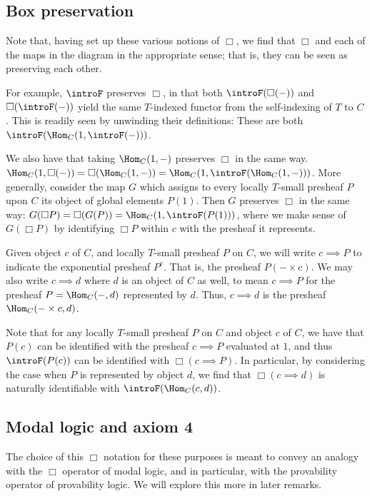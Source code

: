 \subsection{Box preservation}
Note that, having set up these various notions of $\Box$, we find that $\Box$ and each of the maps in the diagram  in the appropriate sense; that is, they can be seen as preserving each other.

For example, $\introF$ preserves $\Box$, in that both $\introF(\Box(-))$ and $\Box(\introF(-))$ yield the same $T$-indexed functor from the self-indexing of $T$ to $C$. This is readily seen by unwinding their definitions: These are both $\introF(\Hom_C(1, \introF(-)))$.

We also have that taking $\Hom_C(1, -)$ preserves $\Box$ in the same way. $\Hom_C(1, \Box(-)) = \Box(\Hom_C(1, -)) = \Hom_C(1, \introF(\Hom_C(1, -)))$. More generally, consider the map $G$ which assigns to every locally $T$-small presheaf $P$ upon $C$ its object of global elements $P(1)$. Then $G$ preserves $\Box$ in the same way: $G(\Box P) = \Box(G(P)) = \Hom_C(1, \introF(P(1)))$, where we make sense of $G(\Box P)$ by identifying $\Box P$ within $c$ with the presheaf it represents.

Given object $c$ of $C$, and locally $T$-small presheaf $P$ on $C$, we will write $c \implies P$ to indicate the exponential presheaf $P^c$. That is, the presheaf $P(- \times c)$. We may also write $c \implies d$ where $d$ is an object of $C$ as well, to mean $c \implies P$ for the presheaf $P = \Hom_C(-, d)$ represented by $d$. Thus, $c \implies d$ is the presheaf $\Hom_C(- \times c, d)$.

Note that for any locally $T$-small presheaf $P$ on $C$ and object $c$ of $C$, we have that $P(c)$ can be identified with the presheaf $c \implies P$ evaluated at $1$, and thus $\introF(P(c))$ can be identified with $\Box(c \implies P)$. In particular, by considering the case when $P$ is represented by object $d$, we find that $\Box(c \implies d)$ is naturally identifiable with $\introF(\Hom_C(c, d))$.

\subsection{Modal logic and axiom 4}
The choice of this $\Box$ notation for these purposes is meant to convey an analogy with the $\Box$ operator of modal logic, and in particular, with the provability operator of provability logic. We will explore this more in later remarks.

